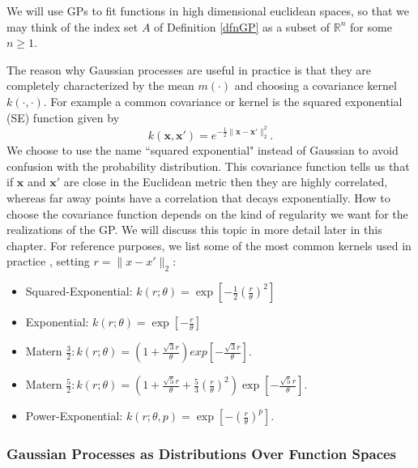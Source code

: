 \documentclass[12pt]{book}
\newcommand{\x}{\textbf{x}}
\begin{document}
 

We will use GPs to fit  functions in  high dimensional euclidean spaces, so 
that we may think
of the  index set $A$ of Definition \ref{dfnGP} as a subset of $\mathbb{R}^{n}$ for some $n\geq 1$. 
\newline

The reason why  Gaussian processes are useful in practice is that  they are 
completely characterized by the mean $m(\cdot)$ and choosing a covariance kernel $k(\cdot,\cdot)$\cite{lifshits2012lectures}. 
 For example a  common covariance or kernel is the
 squared exponential (SE) function given by  
\begin{equation}\label{eqnsquareexponential}
k(\x,\x')=e^{-\frac{1}{2}\|\x-\x'\|_{2}^{2}}.
\end{equation}
We choose to use the name ``squared exponential" instead of 
Gaussian to avoid confusion with
the probability distribution.
This  covariance function tells us that if $\x$ and $\x'$ are close in the Euclidean metric 
then they are highly correlated, whereas far away points have a correlation that decays exponentially.
How to choose the covariance function depends on the kind
of regularity we want for the realizations of the GP. We will discuss this topic in
more detail later in this chapter. For reference purposes, we list 
some of the most common kernels used in practice \cite{rasmussen2006gaussian}, setting $r=\|x-x'\|_{2}$:

\begin{itemize}
\item Squared-Exponential: $k(r;\theta)=\exp\left[-\frac{1}{2}(\frac{r}{\theta})^{2}\right]$
\item Exponential: $k(r;\theta)=\exp\left[-\frac{r}{\theta}\right]$\\
\item Matern $\frac{3}{2}: k(r;\theta)=(1+\frac{\sqrt{3}r}{\theta})exp\left[-\frac{\sqrt{3}r}{\theta}\right]$.
\item Matern $\frac{5}{2}: k(r;\theta)=(1+\frac{\sqrt{5}r}{\theta}+\frac{5}{3}
(\frac{r}{\theta})^{2})\exp\left[-\frac{\sqrt{5}r}{\theta}\right]$.
\item Power-Exponential: $k(r;\theta,p)=\exp\left[-(\frac{r}{\theta})^{p}\right]$.
\end{itemize}





\subsubsection{Gaussian Processes as Distributions Over Function Spaces}
\end{document}
